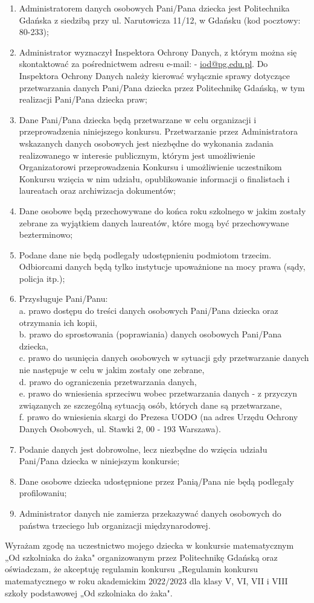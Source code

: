 \documentclass[10pt]{article}
\begin{document}
\begin{enumerate}
  \item Administratorem danych osobowych Pani/Pana dziecka jest Politechnika Gdańska z siedzibą przy ul. Narutowicza 11/12, w Gdańsku (kod pocztowy: 80-233);
  \item Administrator wyznaczył Inspektora Ochrony Danych, z którym można się skontaktować za pośrednictwem adresu e-mail: - \href{mailto:iod@pg.edu.pl}{iod@pg.edu.pl}. Do Inspektora Ochrony Danych należy kierować wyłącznie sprawy dotyczące przetwarzania danych Pani/Pana dziecka przez Politechnikę Gdańską, w tym realizacji Pani/Pana dziecka praw;
  \item Dane Pani/Pana dziecka będą przetwarzane w celu organizacji i przeprowadzenia niniejszego konkursu. Przetwarzanie przez Administratora wskazanych danych osobowych jest niezbędne do wykonania zadania realizowanego w interesie publicznym, którym jest umożliwienie Organizatorowi przeprowadzenia Konkursu i umożliwienie uczestnikom Konkursu wzięcia w nim udziału, opublikowanie informacji o finalistach i laureatach oraz archiwizacja dokumentów;
  \item Dane osobowe będą przechowywane do końca roku szkolnego w jakim zostały zebrane za wyjątkiem danych laureatów, które mogą być przechowywane bezterminowo;
  \item Podane dane nie będą podlegały udostępnieniu podmiotom trzecim. Odbiorcami danych będą tylko instytucje upoważnione na mocy prawa (sądy, policja itp.);
  \item Przysługuje Pani/Panu:\\
a. prawo dostępu do treści danych osobowych Pani/Pana dziecka oraz otrzymania ich kopii,\\
b. prawo do sprostowania (poprawiania) danych osobowych Pani/Pana dziecka,\\
c. prawo do usunięcia danych osobowych w sytuacji gdy przetwarzanie danych nie następuje w celu w jakim zostały one zebrane,\\
d. prawo do ograniczenia przetwarzania danych,\\
e. prawo do wniesienia sprzeciwu wobec przetwarzania danych - z przyczyn związanych ze szczególną sytuacją osób, których dane są przetwarzane,\\
f. prawo do wniesienia skargi do Prezesa UODO (na adres Urzędu Ochrony Danych Osobowych, ul. Stawki 2, 00 - 193 Warszawa).
  \item Podanie danych jest dobrowolne, lecz niezbędne do wzięcia udziału Pani/Pana dziecka w niniejszym konkursie;
  \item Dane osobowe dziecka udostępnione przez Panią/Pana nie będą podlegały profilowaniu;
  \item Administrator danych nie zamierza przekazywać danych osobowych do państwa trzeciego lub organizacji międzynarodowej.
\end{enumerate}

Wyrażam zgodę na uczestnictwo mojego dziecka w konkursie matematycznym „Od szkolniaka do żaka" organizowanym przez Politechnikę Gdańską oraz oświadczam, że akceptuję regulamin konkursu „Regulamin konkursu matematycznego w roku akademickim \(2022 / 2023\) dla klasy V, VI, VII i VIII szkoły podstawowej „Od szkolniaka do żaka".
\end{document}
